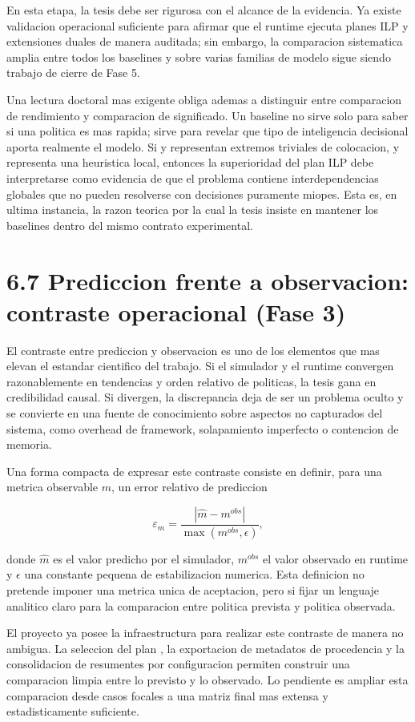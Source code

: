 En esta etapa, la tesis debe ser rigurosa con el alcance de la evidencia. Ya existe validacion operacional suficiente para afirmar que el runtime ejecuta planes ILP y extensiones duales de manera auditada; sin embargo, la comparacion sistematica amplia entre todos los baselines y sobre varias familias de modelo sigue siendo trabajo de cierre de Fase 5.

Una lectura doctoral mas exigente obliga ademas a distinguir entre comparacion de rendimiento y comparacion de significado. Un baseline no sirve solo para saber si una politica es mas rapida; sirve para revelar que tipo de inteligencia decisional aporta realmente el modelo. Si  y  representan extremos triviales de colocacion, y  representa una heuristica local, entonces la superioridad del plan ILP debe interpretarse como evidencia de que el problema contiene interdependencias globales que no pueden resolverse con decisiones puramente miopes. Esta es, en ultima instancia, la razon teorica por la cual la tesis insiste en mantener los baselines dentro del mismo contrato experimental.

\section{6.7 Prediccion frente a observacion: contraste operacional (Fase 3)}
El contraste entre prediccion y observacion es uno de los elementos que mas elevan el estandar cientifico del trabajo. Si el simulador y el runtime convergen razonablemente en tendencias y orden relativo de politicas, la tesis gana en credibilidad causal. Si divergen, la discrepancia deja de ser un problema oculto y se convierte en una fuente de conocimiento sobre aspectos no capturados del sistema, como overhead de framework, solapamiento imperfecto o contencion de memoria.

Una forma compacta de expresar este contraste consiste en definir, para una metrica observable $m$, un error relativo de prediccion

$$
\varepsilon_m = \frac{|\hat{m} - m^{obs}|}{\max(m^{obs},\epsilon)},
$$

donde $\hat{m}$ es el valor predicho por el simulador, $m^{obs}$ el valor observado en runtime y $\epsilon$ una constante pequena de estabilizacion numerica. Esta definicion no pretende imponer una metrica unica de aceptacion, pero si fijar un lenguaje analitico claro para la comparacion entre politica prevista y politica observada.

El proyecto ya posee la infraestructura para realizar este contraste de manera no ambigua. La seleccion del plan , la exportacion de metadatos de procedencia y la consolidacion de resumentes por configuracion permiten construir una comparacion limpia entre lo previsto y lo observado. Lo pendiente es ampliar esta comparacion desde casos focales a una matriz final mas extensa y estadisticamente suficiente.

